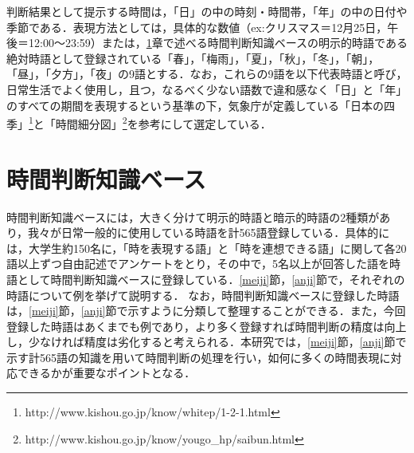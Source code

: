判断結果として提示する時間は，「日」の中の時刻・時間帯，「年」の中の日付や季節である．表現方法としては，具体的な数値（ex:クリスマス＝12月25日，午後＝12:00〜23:59）または，\ref{time_judgment_knowledge_base}章で述べる時間判断知識ベースの明示的時語である絶対時語として登録されている「春」，「梅雨」，「夏」，「秋」，「冬」，「朝」，「昼」，「夕方」，「夜」の9語とする．なお，これらの9語を以下代表時語と呼び，日常生活でよく使用し，且つ，なるべく少ない語数で違和感なく「日」と「年」のすべての期間を表現するという基準の下，気象庁が定義している「日本の四季」\footnote{http://www.kishou.go.jp/know/whitep/1-2-1.html}と「時間細分図」\footnote{http://www.kishou.go.jp/know/yougo\_hp/saibun.html}を参考にして選定している．

\section{時間判断知識ベース}\label{time_judgment_knowledge_base}
時間判断知識ベースには，大きく分けて明示的時語と暗示的時語の2種類があり，我々が日常一般的に使用している時語を計565語登録している．具体的には，大学生約150名に，「時を表現する語」と「時を連想できる語」に関して各20語以上ずつ自由記述でアンケートをとり，その中で，5名以上が回答した語を時語として時間判断知識ベースに登録している．\ref{meiji}節，\ref{anji}節で，それぞれの時語について例を挙げて説明する．
なお，時間判断知識ベースに登録した時語は，\ref{meiji}節，\ref{anji}節で示すように分類して整理することができる．また，今回登録した時語はあくまでも例であり，より多く登録すれば時間判断の精度は向上し，少なければ精度は劣化すると考えられる．本研究では，\ref{meiji}節，\ref{anji}節で示す計565語の知識を用いて時間判断の処理を行い，如何に多くの時間表現に対応できるかが重要なポイントとなる．


